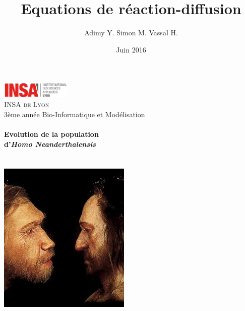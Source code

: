 \documentclass[a4paper,11pt]{article}
\begin{document}
\author{Adimy Y.  Simon M.  Vassal H.}
\title{\Huge\textbf{Equations de réaction-diffusion}}
\date{Juin 2016}

\makeatletter
  \begin{titlepage}
  \centering
  	\vfill
      \includegraphics[width=0.25\textwidth]{logo_insa.png}\\
  	\vspace{0.5cm}
      {\large \textsc{INSA de Lyon}}\\
      3ème année Bio-Informatique et Modélisation\\
    \vfill
      \textbf{\Huge\@title}\\
    \vspace{0.3cm}
      \textbf{\Large Evolution de la population\\ d'\textit{Homo Neanderthalensis}}\\
    \vspace{0.3cm}
       {\large \@author} \\
    \vspace{0.3cm}
        {\large\textbf{\@date}}\\
    \vfill
    	\centering
        \includegraphics[scale=0.8]{neanderthal-sapiens.jpg}
  \end{titlepage}
\makeatother
\newpage
\tableofcontents
\newpage

\setcounter{page}{1}
\end{document}

